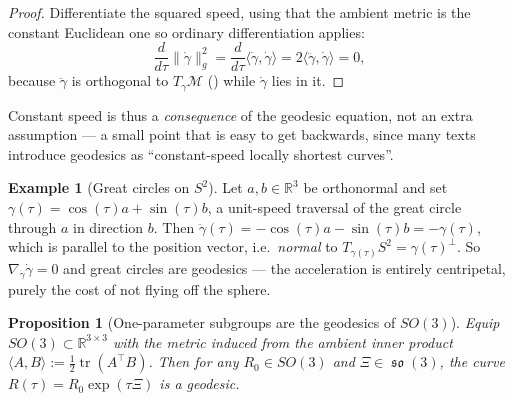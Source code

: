 \documentclass[11pt,a4paper]{report}
\newtheorem{proposition}[proposition]{Proposition}
\theoremstyle{definition}
\newtheorem{example}[example]{Example}
\theoremstyle{remark}
\DeclareMathOperator{\so}{\mathfrak{so}}
\DeclareMathOperator{\tr}{tr}
\newcommand{\RR}{\mathbb R}
\begin{document}
\begin{proof}
Differentiate the squared speed, using that the ambient metric is the
constant Euclidean one so ordinary differentiation applies:
\[
\frac{d}{d\tau}\|\dot\gamma\|_g^2
= \frac{d}{d\tau}\langle\dot\gamma,\dot\gamma\rangle
= 2\langle\ddot\gamma,\dot\gamma\rangle
= 0 ,
\]
because $\ddot\gamma$ is orthogonal to $T_{\gamma}\mathcal M$
() while $\dot\gamma$ lies in it.
\end{proof}

Constant speed is thus a \emph{consequence} of the geodesic equation, not an
extra assumption --- a small point that is easy to get backwards, since many
texts introduce geodesics as ``constant-speed locally shortest curves''.

\begin{example}[Great circles on $S^2$]
\label{ex:s2-geodesics}
Let $a,b\in\RR^3$ be orthonormal and set
$\gamma(\tau)=\cos(\tau)a+\sin(\tau)b$, a unit-speed traversal of the great
circle through $a$ in direction $b$. Then
$\ddot\gamma(\tau)=-\cos(\tau)a-\sin(\tau)b=-\gamma(\tau)$, which is
parallel to the position vector, i.e.\ \emph{normal} to
$T_{\gamma(\tau)}S^2=\gamma(\tau)^\perp$. So $\nabla_{\dot\gamma}\dot\gamma=0$
and great circles are geodesics --- the acceleration is entirely centripetal,
purely the cost of not flying off the sphere.
\end{example}

\begin{proposition}[One-parameter subgroups are the geodesics of $SO(3)$]
\label{prop:so3-geodesic-proof}
Equip $SO(3)\subset\RR^{3\times3}$ with the metric induced from the ambient
inner product $\langle A,B\rangle:=\tfrac12\tr(A^\top B)$. Then for any
$R_0\in SO(3)$ and $\Xi\in\so(3)$, the curve $R(\tau)=R_0\exp(\tau\Xi)$ is a
geodesic.
\end{proposition}
\end{document}
